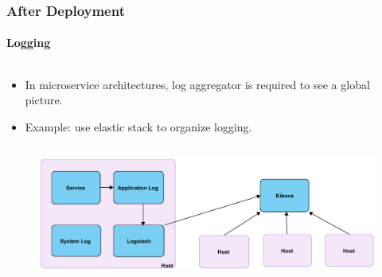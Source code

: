 \documentclass{beamer}
\begin{document}
\begin{frame}
\begin{columns}
\begin{column}{.49\textwidth}
\begin{figure}
\begin{center}
		\end{center}
	\end{figure}
\end{column}
\end{columns}
\end{frame}

\begin{frame}
	\frametitle{After Deployment}
	\framesubtitle{Logging}

\begin{columns}
 \begin{column}{.75\textwidth}
	\begin{itemize}
\item In microservice architectures, log aggregator is required to see a global picture.
\item Example: use elastic stack to organize logging.
	\end{itemize}
\end{column}

\end{columns}
	\begin{figure}
		\begin{center}
			\includegraphics[scale=0.6]{logging}
		\end{center}
	\end{figure}
\end{frame}
\end{document}
